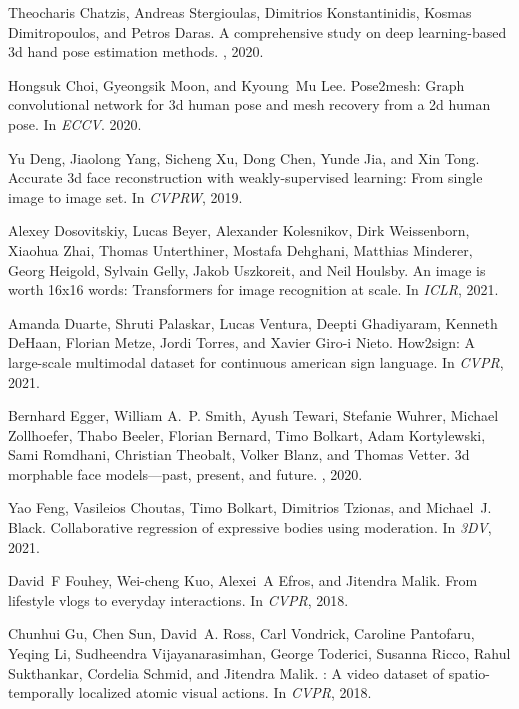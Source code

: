 \documentclass[10pt,twocolumn,letterpaper]{article}
\begin{document}
\begin{thebibliography}{10}
Theocharis Chatzis, Andreas Stergioulas, Dimitrios Konstantinidis, Kosmas
  Dimitropoulos, and Petros Daras.
\newblock A comprehensive study on deep learning-based 3d hand pose estimation
  methods.
, 2020.

Hongsuk Choi, Gyeongsik Moon, and Kyoung~Mu Lee.
\newblock Pose2mesh: Graph convolutional network for 3d human pose and mesh
  recovery from a 2d human pose.
\newblock In {\em ECCV}. 2020.

Yu Deng, Jiaolong Yang, Sicheng Xu, Dong Chen, Yunde Jia, and Xin Tong.
\newblock Accurate 3d face reconstruction with weakly-supervised learning: From
  single image to image set.
\newblock In {\em CVPRW}, 2019.

Alexey Dosovitskiy, Lucas Beyer, Alexander Kolesnikov, Dirk Weissenborn,
  Xiaohua Zhai, Thomas Unterthiner, Mostafa Dehghani, Matthias Minderer, Georg
  Heigold, Sylvain Gelly, Jakob Uszkoreit, and Neil Houlsby.
\newblock An image is worth 16x16 words: Transformers for image recognition at
  scale.
\newblock In {\em ICLR}, 2021.

Amanda Duarte, Shruti Palaskar, Lucas Ventura, Deepti Ghadiyaram, Kenneth
  DeHaan, Florian Metze, Jordi Torres, and Xavier Giro-i Nieto.
\newblock How2sign: A large-scale multimodal dataset for continuous american
  sign language.
\newblock In {\em CVPR}, 2021.

Bernhard Egger, William A.~P. Smith, Ayush Tewari, Stefanie Wuhrer, Michael
  Zollhoefer, Thabo Beeler, Florian Bernard, Timo Bolkart, Adam Kortylewski,
  Sami Romdhani, Christian Theobalt, Volker Blanz, and Thomas Vetter.
\newblock 3d morphable face models—past, present, and future.
, 2020.

Yao Feng, Vasileios Choutas, Timo Bolkart, Dimitrios Tzionas, and Michael~J.
  Black.
\newblock Collaborative regression of expressive bodies using moderation.
\newblock In {\em 3DV}, 2021.

David~F Fouhey, Wei-cheng Kuo, Alexei~A Efros, and Jitendra Malik.
\newblock From lifestyle vlogs to everyday interactions.
\newblock In {\em CVPR}, 2018.

Chunhui Gu, Chen Sun, David~A. Ross, Carl Vondrick, Caroline Pantofaru, Yeqing
  Li, Sudheendra Vijayanarasimhan, George Toderici, Susanna Ricco, Rahul
  Sukthankar, Cordelia Schmid, and Jitendra Malik.
: A video dataset of spatio-temporally localized atomic visual
  actions.
\newblock In {\em CVPR}, 2018.


\end{thebibliography}
\end{document}
